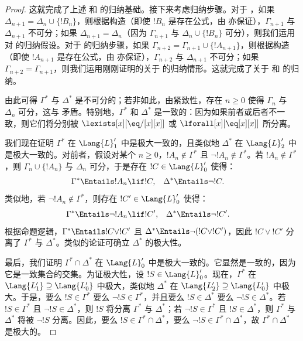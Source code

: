 \documentclass[../../../include/open-logic-section]{subfiles}
\begin{document}
\begin{proof}
这就完成了上述  和  的归纳基础。接下来考虑归纳步骤。对于 ，如果 $\Delta_{n+1} = \Delta_n \cup \{ !B_n \}$，则根据构造（即使 $!B_n$ 是存在公式，由  亦保证），$\Gamma_{n+1}$ 与 $\Delta_{n+1}$ 不可分；如果 $\Delta_{n+1} = \Delta_n$（因为 $\Gamma_{n+1}$ 与 $\Delta_n \cup \{!B_n\}$ 可分），则我们运用对  的归纳假设。对于  的归纳步骤，如果 $\Gamma_{n+2} = \Gamma_{n+1} \cup
\{!A_{n+1} \}$，则根据构造（即使 $!A_{n+1}$ 是存在公式，由  亦保证），$\Gamma_{n+2}$ 与 $\Delta_{n+1}$ 不可分；如果 $\Gamma_{n+2} = \Gamma_{n+1}$，则我们运用刚刚证明的关于  的归纳情形。这就完成了关于  和  的归纳。

由此可得 $\Gamma^*$ 与 $\Delta^*$ 是不可分的；若非如此，由紧致性，存在 $n \ge 0$ 使得 $\Gamma_n$ 与 $\Delta_n$ 可分，这与  矛盾。特别地，$\Gamma^*$ 和 $\Delta^*$ 是一致的：因为如果前者或后者不一致，则它们将分别被 $\lexists[x][\eq/[x][x]]$ 或 $\lforall[x][\eq[x][x]]$ 所分离。

我们现在证明 $\Gamma^*$ 在 $\Lang{L}'_1$ 中是极大一致的，且类似地 $\Delta^*$ 在 $\Lang{L}'_2$ 中是极大一致的。对前者，假设对某个 $n \ge 0$，$!A_n \notin \Gamma^*$ 且 $\lnot !A_n \notin \Gamma^*$。若 $!A_n \notin \Gamma^*$，则 $\Gamma_n \cup \{!A_n \}$ 与 $\Delta_n$ 可分，于是存在 $!C \in \Lang{L}'_0$ 使得：
\begin{align*}
  \Gamma^* & \Entails !A_n \lif !C, &
  \Delta^* & \Entails \lnot !C.
\end{align*}
类似地，若 $\lnot !A_n \notin \Gamma^*$，则存在 $!C' \in
\Lang{L}'_0$ 使得：
\begin{align*}
  \Gamma^* & \Entails \lnot !A_n \lif !C', &
  \Delta^* & \Entails \lnot !C'.
\end{align*}
根据命题逻辑，$\Gamma^* \Entails !C \lor !C'$ 且 $\Delta^* \Entails \lnot (!C \lor !C')$，因此 $!C \lor !C'$ 分离了 $\Gamma^*$ 与 $\Delta^*$。类似的论证可确立 $\Delta^*$ 的极大性。

最后，我们证明 $\Gamma^* \cap \Delta^*$ 在 $\Lang{L}'_0$ 中是极大一致的。它显然是一致的，因为它是一致集合的交集。为证极大性，设 $!S \in \Lang{L}'_0$。现在，$\Gamma^*$ 在 $\Lang{L'_1}
\supseteq \Lang{L'_0}$ 中极大，类似地 $\Delta^*$ 在 $\Lang{L'_2} \supseteq \Lang{L'_0}$ 中极大。于是，要么 $!S \in \Gamma^*$ 要么 $\lnot !S \in \Gamma^*$，并且要么 $!S \in \Delta^*$ 要么 $\lnot !S \in \Delta^*$。若 $!S \in \Gamma^*$ 且 $\lnot !S \in \Delta^*$，则 $!S$ 将分离 $\Gamma^*$ 与 $\Delta^*$；若 $\lnot !S \in \Gamma^*$ 且 $!S \in \Delta^*$，则 $\Gamma^*$ 与 $\Delta^*$ 将被 $\lnot !S$ 分离。因此，要么 $!S \in \Gamma^* \cap \Delta^*$，要么 $\lnot !S \in \Gamma^* \cap \Delta^*$，故 $\Gamma^* \cap \Delta^*$ 是极大的。


\end{proof}
\end{document}
